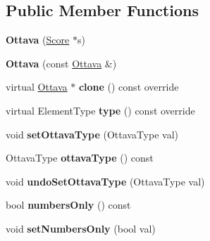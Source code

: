 \subsection*{Public Member Functions}
\begin{DoxyCompactItemize}
\item 
\mbox{\label{class_ms_1_1_ottava_aa9a3e7d924ff07b5e579c26c58957ae5}} 
{\bfseries Ottava} (\hyperlink{class_ms_1_1_score}{Score} $\ast$s)
\item 
\mbox{\label{class_ms_1_1_ottava_ad13d24169c90bf42c0cdae9e3e90ab03}} 
{\bfseries Ottava} (const \hyperlink{class_ms_1_1_ottava}{Ottava} \&)
\item 
\mbox{\label{class_ms_1_1_ottava_af56e2b7a0d7b5f071eea8ceca1393a71}} 
virtual \hyperlink{class_ms_1_1_ottava}{Ottava} $\ast$ {\bfseries clone} () const override
\item 
\mbox{\label{class_ms_1_1_ottava_ac30104b27d55fa1ad1345b4ca11eed10}} 
virtual Element\+Type {\bfseries type} () const override
\item 
\mbox{\label{class_ms_1_1_ottava_afbad30e457b9aed99bc0b22791ffa85a}} 
void {\bfseries set\+Ottava\+Type} (Ottava\+Type val)
\item 
\mbox{\label{class_ms_1_1_ottava_a1ad808ce94f4a5ddc17b9adcc86802f0}} 
Ottava\+Type {\bfseries ottava\+Type} () const
\item 
\mbox{\label{class_ms_1_1_ottava_ad7b5ab0c230919ff56fae08a385db0af}} 
void {\bfseries undo\+Set\+Ottava\+Type} (Ottava\+Type val)
\item 
\mbox{\label{class_ms_1_1_ottava_a03960f91a50095606a59ee0b81fa7b42}} 
bool {\bfseries numbers\+Only} () const
\item 
\mbox{\label{class_ms_1_1_ottava_a042053802aaab155026d5d37d150521c}} 
void {\bfseries set\+Numbers\+Only} (bool val)
\item 
\mbox{\label{class_ms_1_1_ottava_abcfb6166b110d5aed2daf95e4e057af0}} 

\end{DoxyCompactItemize}
